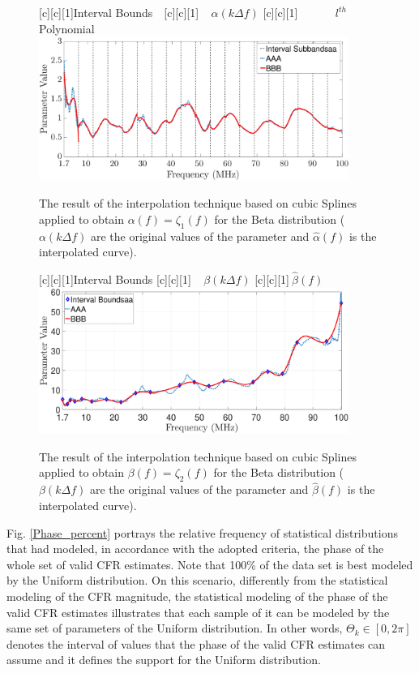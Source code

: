 \begin{figure}[h]
	\centering
	[c][1]{Interval Bounds$~~~$}
	[c][1]{$~~~~~{\alpha}(k \Delta f)$}
	[c][1]{$~~~~~~~~~~~~~~~l^{th}$ Polynomial}
	\includegraphics[width=0.9\textwidth]{images/SPLINE_Polynomials.eps}
	\caption{The result of the interpolation technique based on cubic Splines applied to obtain $\alpha(f)=\zeta_1(f)$ for the Beta distribution (${\alpha}(k \Delta f)$ are the original values of the parameter and $\hat{\alpha}(f)$ is the interpolated curve).}
	\label{Fit_alfa_poli}
\end{figure}

\begin{figure}[h]
	\centering
	[c][1]{Interval Bounds}
	[c][1]{$~~~~~{\beta}(k \Delta f)$}
	[c][1]{$~\hat{\beta}(f)$}
	\includegraphics[width=0.9\textwidth]{images/Beta_fit_17.eps}
	\caption{The result of the interpolation technique based on cubic Splines applied to obtain $\beta(f)=\zeta_2(f)$ for the Beta distribution (${\beta}(k \Delta f)$ are the original values of the parameter and $\hat{\beta}(f)$ is the interpolated curve).}
	\label{Fit_beta}
\end{figure}

Fig. \ref{Phase_percent} portrays the relative frequency of statistical distributions that had modeled, in accordance with the adopted criteria, the phase of the whole set of valid \ac{CFR} estimates. Note that 100\% of the data set is best modeled by the Uniform distribution. On this scenario, differently from the statistical modeling of the \ac{CFR} magnitude, the statistical modeling of the phase of the valid \ac{CFR} estimates illustrates that each sample of it can be modeled by the same set of parameters of the Uniform distribution. In other words, $\Theta_k \in [0, 2\pi]$ denotes the interval of values that the phase of the valid \ac{CFR} estimates can assume and it defines the support for the Uniform distribution. 

